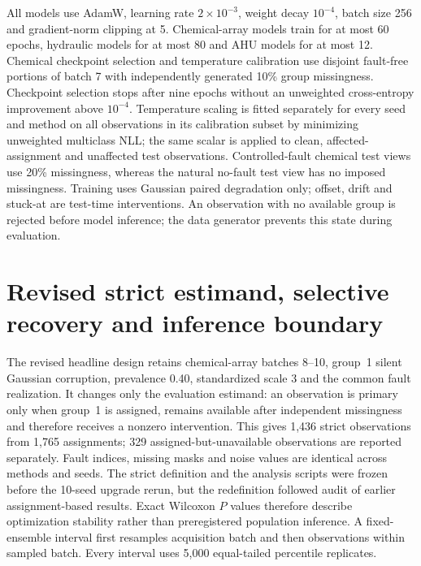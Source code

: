 \documentclass[10pt]{article}
\begin{document}
All models use AdamW, learning rate $2\times10^{-3}$, weight decay $10^{-4}$, batch size 256 and gradient-norm clipping at 5. Chemical-array models train for at most 60 epochs, hydraulic models for at most 80 and AHU models for at most 12. Chemical checkpoint selection and temperature calibration use disjoint fault-free portions of batch 7 with independently generated 10\% group missingness. Checkpoint selection stops after nine epochs without an unweighted cross-entropy improvement above $10^{-4}$. Temperature scaling is fitted separately for every seed and method on all observations in its calibration subset by minimizing unweighted multiclass NLL; the same scalar is applied to clean, affected-assignment and unaffected test observations. Controlled-fault chemical test views use 20\% missingness, whereas the natural no-fault test view has no imposed missingness. Training uses Gaussian paired degradation only; offset, drift and stuck-at are test-time interventions. An observation with no available group is rejected before model inference; the data generator prevents this state during evaluation.

\begin{table}[ht]
\centering
\caption{Parameter count and measured CPU cost on the chemical-array run. Training times include early stopping and therefore vary with selected epoch. Inference excludes data loading.}
\resizebox{0.82\textwidth}{!}{}
\end{table}

\section{Revised strict estimand, selective recovery and inference boundary}

The revised headline design retains chemical-array batches 8--10, group~1 silent Gaussian corruption, prevalence 0.40, standardized scale 3 and the common fault realization. It changes only the evaluation estimand: an observation is primary only when group~1 is assigned, remains available after independent missingness and therefore receives a nonzero intervention. This gives 1,436 strict observations from 1,765 assignments; 329 assigned-but-unavailable observations are reported separately. Fault indices, missing masks and noise values are identical across methods and seeds. The strict definition and the analysis scripts were frozen before the 10-seed upgrade rerun, but the redefinition followed audit of earlier assignment-based results. Exact Wilcoxon $P$ values therefore describe optimization stability rather than preregistered population inference. A fixed-ensemble interval first resamples acquisition batch and then observations within sampled batch. Every interval uses 5,000 equal-tailed percentile replicates.
\end{document}
